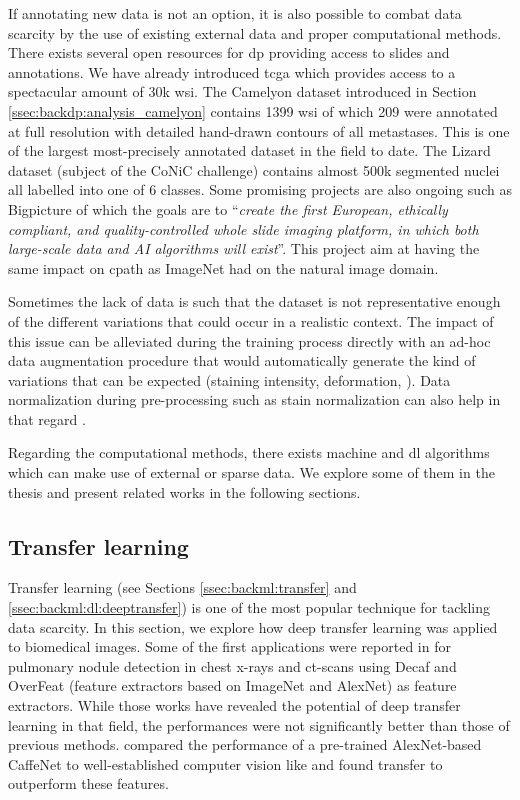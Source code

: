 If annotating new data is not an option, it is also possible to combat data scarcity by the use of existing external data and proper computational methods. There exists several open resources for \acrlong{dp} \parencite{maree2019open} providing access to slides and annotations. We have already introduced \acrshort{tcga} which provides access to a spectacular amount of 30k \acrshort{wsi}. The Camelyon dataset introduced in Section \ref{ssec:backdp:analysis_camelyon} contains 1399 \acrshort{wsi} of which 209 were annotated at full resolution with detailed hand-drawn contours of all metastases. This is one of the largest most-precisely annotated dataset in the field to date. The Lizard dataset (subject of the CoNiC challenge) contains almost 500k segmented nuclei all labelled into one of 6 classes. Some promising projects are also ongoing such as Bigpicture \parencite{moulin2021imi} of which the goals are to ``\textit{create the first European, ethically compliant, and quality-controlled whole slide imaging platform, in which both large-scale data and AI algorithms will exist}''. This project aim at having the same impact on \acrlong{cpath} as ImageNet had on the natural image domain. 

Sometimes the lack of data is such that the dataset is not representative enough of the different variations that could occur in a realistic context. The impact of this issue can be alleviated during the training process directly with an ad-hoc data augmentation procedure that would automatically generate the kind of variations that can be expected (\eg staining intensity, deformation, \etc). Data normalization during pre-processing such as stain normalization can also help in that regard \parencite{kang2021stainnet}.

Regarding the computational methods, there exists machine and \acrlong{dl} algorithms which can make use of external or sparse data. We explore some of them in the thesis and present related works in the following sections. 

\subsection{Transfer learning}
\label{ssec:backdp:tl}

Transfer learning (see Sections \ref{ssec:backml:transfer} and \ref{ssec:backml:dl:deeptransfer}) is one of the most popular technique for tackling data scarcity. In this section, we explore how deep transfer learning was applied to biomedical images. Some of the first applications were reported in \parencite{bar2015chest,ciompi2015automatic,van2015off} for pulmonary nodule detection in chest x-rays and \acrshort{ct}-scans using Decaf and OverFeat (feature extractors based on ImageNet and AlexNet) as feature extractors. While those works have revealed the potential of deep transfer learning in that field, the performances were not significantly better than those of previous methods. \parencite{ravishankar2016understanding} compared the performance of a pre-trained AlexNet-based CaffeNet \parencite{jia2014caffe} to well-established computer vision like  \parencite{mcconnell1986method} and found transfer to outperform these features.

